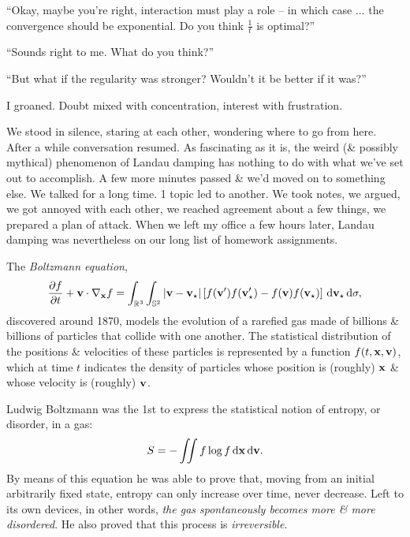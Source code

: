 \documentclass{article}
\numberwithin{equation}{section}
\begin{document}
``Okay, maybe you're right, interaction must play a role -- in which case $\ldots$ the convergence should be exponential. Do you think $\frac{1}{t}$ is optimal?''

``Sounds right to me. What do you think?''

``But what if the regularity was stronger? Wouldn't it be better if it was?''

I groaned. Doubt mixed with concentration, interest with frustration.

We stood in silence, staring at each other, wondering where to go from here. After a while conversation resumed. As fascinating as it is, the weird (\& possibly mythical) phenomenon of Landau damping has nothing to do with what we've set out to accomplish. A few more minutes passed \& we'd moved on to something else. We talked for a long time. 1 topic led to another. We took notes, we argued, we got annoyed with each other, we reached agreement about a few things, we prepared a plan of attack. When we left my office a few hours later, Landau damping was nevertheless on our long list of homework assignments.

The \textit{Boltzmann equation},
\begin{equation*}
	\frac{\partial f}{\partial t} + {\bf v}\cdot\nabla_{\bf x}f = \int_{\mathbb{R}^3}\int_{\mathbb{S}^2} |{\bf v} - {\bf v}_\star|\left[f({\bf v}')f({\bf v}_\star') - f({\bf v})f({\bf v}_\star)\right]\,{\rm d}{\bf v}_\star\,{\rm d}\sigma,
\end{equation*}
discovered around 1870, models the evolution of a rarefied gas made of billions \& billions of particles that collide with one another. The statistical distribution of the positions \& velocities of these particles is represented by a function $f(t,{\bf x},{\bf v})$, which at time $t$ indicates the density of particles whose position is (roughly) $\bf x$ \& whose velocity is (roughly) $\bf v$.

Ludwig Boltzmann was the 1st to express the statistical notion of entropy, or disorder, in a gas:
\begin{equation*}
	S = -\iint f\log f\,{\rm d}{\bf x}\,{\rm d}{\bf v}.
\end{equation*}
By means of this equation he was able to prove that, moving from an initial arbitrarily fixed state, entropy can only increase over time, never decrease. Left to its own devices, in other words, \textit{the gas spontaneously becomes more \& more disordered}. He also proved that this process is \textit{irreversible}.
\end{document}
